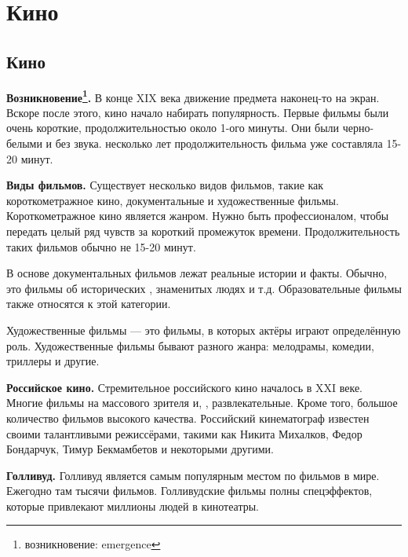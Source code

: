 \chapter{Кино}

\section{Кино}
\textbf{Возникновение\footnote{возникновение: emergence}.}
В конце XIX века движение предмета наконец-то   на экран. Вскоре после этого, кино начало набирать популярность. Первые фильмы были очень короткие, продолжительностью около 1-ого минуты. Они были черно-белыми и без звука.  несколько лет продолжительность фильма уже составляла 15-20 минут.

\textbf{Виды фильмов.}
Существует несколько видов фильмов, такие как короткометражное кино, документальные и художественные фильмы.
Короткометражное кино является  жанром. Нужно быть профессионалом, чтобы передать целый ряд чувств за короткий промежуток времени. Продолжительность таких фильмов обычно не  15-20 минут.

В основе документальных фильмов лежат реальные истории и факты. Обычно, это фильмы об исторических , знаменитых людях и т.д.
Образовательные фильмы также относятся к этой категории.

Художественные фильмы --- это фильмы, в которых актёры играют определённую роль. Художественные фильмы бывают разного жанра: мелодрамы, комедии, триллеры и другие.

\textbf{Российское кино.}
Стремительное  российского кино началось в XXI веке. Многие фильмы  на массового зрителя и, , развлекательные. Кроме того,  большое количество фильмов высокого качества. Российский кинематограф известен своими талантливыми режиссёрами, такими как Никита Михалков, Федор Бондарчук, Тимур Бекмамбетов и некоторыми другими.

\textbf{Голливуд.}
Голливуд является самым популярным местом по  фильмов в мире. Ежегодно там  тысячи фильмов. Голливудские фильмы полны спецэффектов, которые привлекают миллионы людей в кинотеатры.

